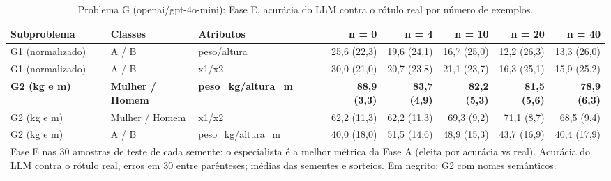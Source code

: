 \begin{table}[htbp]
\centering
\small
\caption{Problema G (openai/gpt-4o-mini): Fase E, acurácia do LLM contra o rótulo real por número de exemplos.}
\label{tab:bloco3_G_faseE_nshot_gpt4mini}
\begin{tabular}{lllrrrrr}
\toprule
Subproblema & Classes & Atributos & n = 0 & n = 4 & n = 10 & n = 20 & n = 40 \\
\midrule
G1 (normalizado) & A / B & peso/altura & 25,6 (22,3) & 19,6 (24,1) & 16,7 (25,0) & 12,2 (26,3) & 13,3 (26,0) \\
G1 (normalizado) & A / B & x1/x2 & 30,0 (21,0) & 20,7 (23,8) & 21,1 (23,7) & 16,3 (25,1) & 15,9 (25,2) \\
\textbf{G2 (kg e m)} & \textbf{Mulher / Homem} & \textbf{peso\_kg/altura\_m} & \textbf{88,9 (3,3)} & \textbf{83,7 (4,9)} & \textbf{82,2 (5,3)} & \textbf{81,5 (5,6)} & \textbf{78,9 (6,3)} \\
G2 (kg e m) & Mulher / Homem & x1/x2 & 62,2 (11,3) & 62,2 (11,3) & 69,3 (9,2) & 71,1 (8,7) & 68,5 (9,4) \\
G2 (kg e m) & A / B & peso\_kg/altura\_m & 40,0 (18,0) & 51,5 (14,6) & 48,9 (15,3) & 43,7 (16,9) & 40,4 (17,9) \\
\bottomrule
\multicolumn{8}{p{0.95\linewidth}}{\footnotesize Fase E nas 30 amostras de teste de cada semente; o especialista é a melhor métrica da Fase A (eleita por acurácia vs real). Acurácia do LLM contra o rótulo real, erros em 30 entre parênteses; médias das sementes e sorteios. Em negrito: G2 com nomes semânticos.} \\
\end{tabular}
\end{table}
